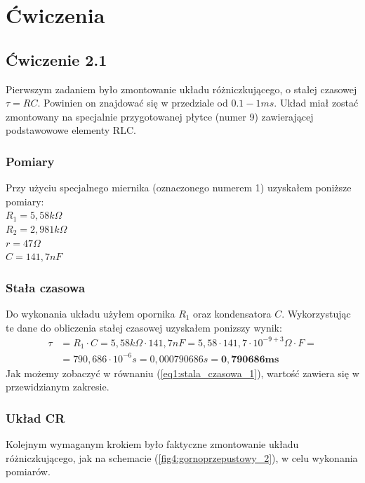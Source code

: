 \documentclass{article}
\begin{document}
  \section{Ćwiczenia}
    \subsection{Ćwiczenie 2.1}
      Pierwszym zadaniem było zmontowanie układu różniczkującego, o stałej czasowej $\tau = RC$. Powinien on znajdować się w przedziale od $0.1 - 1 ms$. Układ miał zostać zmontowany na specjalnie przygotowanej płytce (numer 9) zawierającej podstawowowe elementy RLC.
      \subsubsection{Pomiary}
        Przy użyciu specjalnego miernika (oznaczonego numerem 1) uzyskałem poniższe pomiary:\\
        \mbox{} \qquad $R_1 = 5,58 k\Omega$ \\
        \mbox{} \qquad $R_2 = 2,981k\Omega$ \\
        \mbox{} \qquad $r = 47 \Omega$ \\
        \mbox{} \qquad $C = 141,7 nF$ \\
      \subsubsection{Stała czasowa}
        Do wykonania układu użyłem opornika $R_1$ oraz kondensatora $C$. Wykorzystując te dane do obliczenia stałej czasowej uzyskałem ponizszy wynik:
        \begin{equation}
          \begin{split}
            \tau &= R_1 \cdot C = 5,58k\Omega \cdot 141,7nF = 5,58 \cdot 141,7 \cdot 10^{-9+3} \Omega \cdot F = \\
            &= 790,686 \cdot 10^{-6} s = 0,000790686s = \mathbf{0,790686 ms}
          \end{split}
          \label{eq1:stala_czasowa_1}
        \end{equation}
        Jak możemy zobaczyć w równaniu (\ref{eq1:stala_czasowa_1}), wartość zawiera się w przewidzianym zakresie.

      \subsubsection{Układ CR}
        Kolejnym wymaganym krokiem było faktyczne zmontowanie układu różniczkującego, jak na schemacie (\ref{fig4:gornoprzepustowy_2}), w celu wykonania pomiarów.
          
\end{document}
